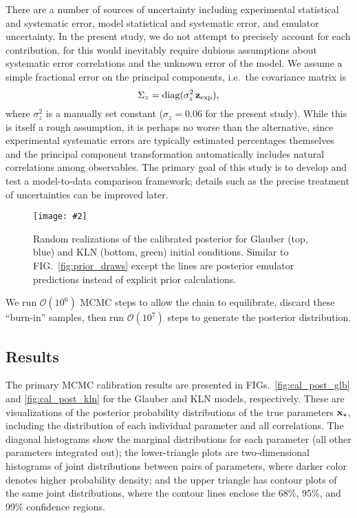 \documentclass[aps,prc,reprint,superscriptaddress,amsmath]{revtex4-1}
\newcommand{\widefig}[3][t]{
  \begin{figure*}[#1]
    \texttt{[image: \#2]}
    \caption{\label{fig:#2}#3}
  \end{figure*}
}
\newcommand{\order}[1]{$\mathcal O(10^{#1})$}
\begin{document}
There are a number of sources of uncertainty including experimental statistical and systematic error, model statistical and systematic error, and emulator uncertainty.
In the present study, we do not attempt to precisely account for each contribution, for this would inevitably require dubious assumptions about systematic error correlations and the unknown error of the model.
We assume a simple fractional error on the principal components, i.e.\ the covariance matrix is
\begin{equation}
  \Sigma_z = \text{diag}(\sigma^2_z\,\mathbf z_\text{exp}),
\end{equation}
where $\sigma^2_z$ is a manually set constant ($\sigma_z = 0.06$ for the present study).
While this is itself a rough assumption, it is perhaps no worse than the alternative, since experimental systematic errors are typically estimated percentages themselves and the principal component transformation automatically includes natural correlations among observables.
The primary goal of this study is to develop and test a model-to-data comparison framework; details such as the precise treatment of uncertainties can be improved later.

\widefig{post_draws}{
  Random realizations of the calibrated posterior for Glauber (top, blue) and KLN (bottom, green) initial conditions.
  Similar to FIG.~\ref{fig:prior_draws} except the lines are posterior emulator predictions instead of explicit prior calculations.
}

We run \order 6 MCMC steps to allow the chain to equilibrate, discard these ``burn-in'' samples, then run \order 7 steps to generate the posterior distribution.

\subsection{Results}

The primary MCMC calibration results are presented in FIGs.~\ref{fig:cal_post_glb} and \ref{fig:cal_post_kln} for the Glauber and KLN models, respectively.
These are visualizations of the posterior probability distributions of the true parameters $\mathbf x_\star$, including the distribution of each individual parameter and all correlations.
The diagonal histograms show the marginal distributions for each parameter (all other parameters integrated out);
the lower-triangle plots are two-dimensional histograms of joint distributions between pairs of parameters, where darker color denotes higher probability density;
and the upper triangle has contour plots of the same joint distributions, where the contour lines enclose the 68\%, 95\%, and 99\% confidence regions.
\end{document}
